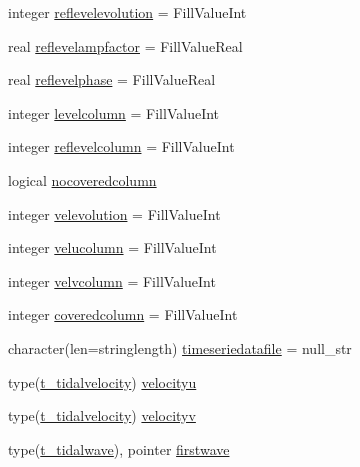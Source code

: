 \begin{DoxyCompactItemize}
\item 
integer \mbox{\hyperlink{structmodulegauge_1_1t__tidegauge_ab49042ed081781c47a646e29a18b1d69}{reflevelevolution}} = Fill\+Value\+Int
\item 
real \mbox{\hyperlink{structmodulegauge_1_1t__tidegauge_adb28ae415e2c111d54cd7eb3df6ada9b}{reflevelampfactor}} = Fill\+Value\+Real
\item 
real \mbox{\hyperlink{structmodulegauge_1_1t__tidegauge_a25eaaceba176573f9d08d9976ac42c4b}{reflevelphase}} = Fill\+Value\+Real
\item 
integer \mbox{\hyperlink{structmodulegauge_1_1t__tidegauge_a94ec47858e07215a979f5c11200d5e0c}{levelcolumn}} = Fill\+Value\+Int
\item 
integer \mbox{\hyperlink{structmodulegauge_1_1t__tidegauge_ac61799ca7a51ce0a9b59dc12037aa7c2}{reflevelcolumn}} = Fill\+Value\+Int
\item 
logical \mbox{\hyperlink{structmodulegauge_1_1t__tidegauge_a4f57ab7311ff323813de60d073d30cab}{nocoveredcolumn}}
\item 
integer \mbox{\hyperlink{structmodulegauge_1_1t__tidegauge_a8755a95f55afb3c2d6683adf62d952b0}{velevolution}} = Fill\+Value\+Int
\item 
integer \mbox{\hyperlink{structmodulegauge_1_1t__tidegauge_a10d63cc8e3d7230e9f867e0915f05d60}{velucolumn}} = Fill\+Value\+Int
\item 
integer \mbox{\hyperlink{structmodulegauge_1_1t__tidegauge_aa9e0aeaf7d61c3047f38dd4e5db631d5}{velvcolumn}} = Fill\+Value\+Int
\item 
integer \mbox{\hyperlink{structmodulegauge_1_1t__tidegauge_a282d24e61c67dece355550e68e071ed2}{coveredcolumn}} = Fill\+Value\+Int
\item 
character(len=stringlength) \mbox{\hyperlink{structmodulegauge_1_1t__tidegauge_ac1366ddf22735aaefdaee14915e15588}{timeseriedatafile}} = null\+\_\+str
\item 
type(\mbox{\hyperlink{structmodulegauge_1_1t__tidalvelocity}{t\+\_\+tidalvelocity}}) \mbox{\hyperlink{structmodulegauge_1_1t__tidegauge_ad4ff98293e712e35ca0dec09bd0e6e98}{velocityu}}
\item 
type(\mbox{\hyperlink{structmodulegauge_1_1t__tidalvelocity}{t\+\_\+tidalvelocity}}) \mbox{\hyperlink{structmodulegauge_1_1t__tidegauge_ae031ac0be7bee0630f2dfa3aa457d023}{velocityv}}
\item 
type(\mbox{\hyperlink{structmodulegauge_1_1t__tidalwave}{t\+\_\+tidalwave}}), pointer \mbox{\hyperlink{structmodulegauge_1_1t__tidegauge_a18e6b887bdeb6501e71520deb605adc4}{firstwave}}

\end{DoxyCompactItemize}
